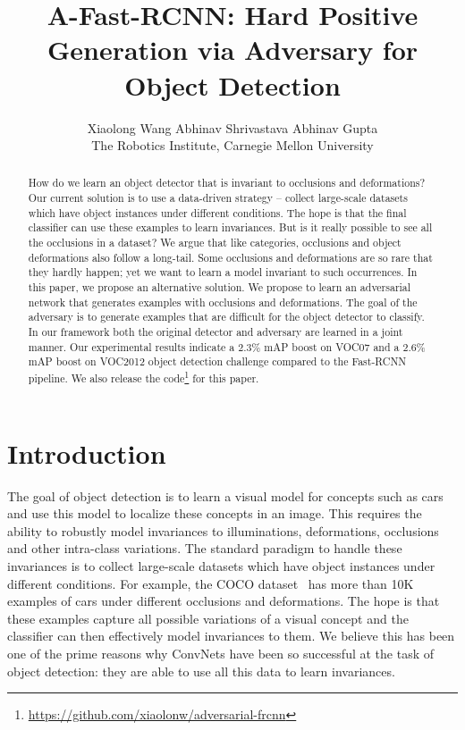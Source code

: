 \documentclass[10pt,twocolumn,letterpaper]{article}
\begin{document}
\title{A-Fast-RCNN: Hard Positive Generation via Adversary for Object Detection}

\author{Xiaolong Wang  \quad     \quad  Abhinav Shrivastava    \quad  \quad  Abhinav Gupta  \\
The Robotics Institute, Carnegie Mellon University \\
}

\maketitle


\begin{abstract}
How do we learn an object detector that is invariant to occlusions and deformations? Our current solution is to use a data-driven strategy -- collect large-scale datasets which have object instances under different conditions. The hope is that the final classifier can use these examples to learn invariances. But is it really possible to see all the occlusions in a dataset? We argue that like categories, occlusions and object deformations also follow a long-tail. Some occlusions and deformations are so rare that they  hardly happen; yet we want to learn a model invariant to such occurrences. In this paper, we propose an alternative solution. We propose to learn an adversarial network that generates examples with occlusions and deformations. The goal of the adversary is to generate examples that are difficult for the object detector to classify. In our framework both the original detector and adversary are learned in a  joint manner. Our experimental results indicate a 2.3\% mAP boost on VOC07 and a 2.6\% mAP boost on VOC2012 object detection challenge compared to the Fast-RCNN pipeline. We also release the  code\footnote{\url{https://github.com/xiaolonw/adversarial-frcnn}} for this paper.  
\end{abstract}


\vspace{-0.1in}
\section{Introduction}
\vspace{-0.05in}
The goal of object detection is to learn a visual model for concepts such as cars and use this model to localize these concepts in an image. This requires the ability to robustly model invariances to illuminations, deformations, occlusions and other intra-class variations. The standard paradigm to handle these invariances is to collect large-scale datasets which have object instances under different conditions. For example, the COCO dataset~\cite{coco} has more than 10K examples of cars under different occlusions and deformations. The hope is that these examples capture all possible variations of a visual concept and the classifier can then effectively model invariances to them. We believe this has been one of the prime reasons why ConvNets have been so successful at the task of object detection: they are able to use all this data to learn invariances.
\end{document}
